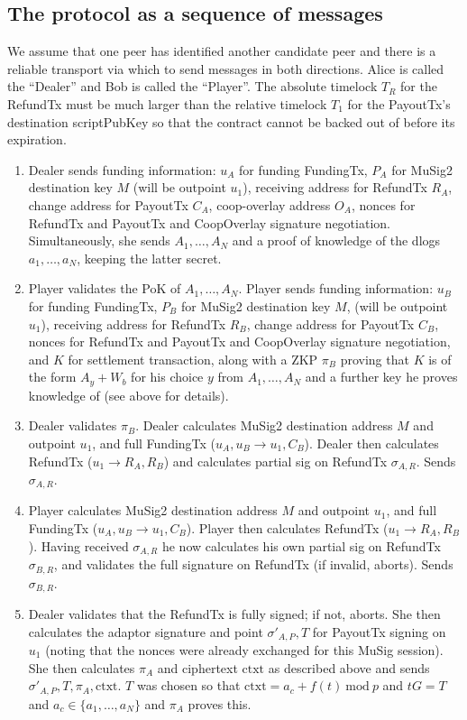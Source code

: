 \documentclass[11pt]{article}
\begin{document}
\subsection{The protocol as a sequence of messages}

We assume that one peer has identified another candidate peer and there is a reliable transport via which to send messages in both directions. Alice is called the ``Dealer'' and Bob is called the ``Player''. The absolute timelock $T_R$ for the RefundTx must be much larger than the relative timelock $T_1$ for the PayoutTx's destination scriptPubKey so that the contract cannot be backed out of before its expiration.

\begin{enumerate}
\item Dealer sends funding information: $u_A$ for funding FundingTx, $P_A$ for MuSig2 destination key $M$ (will be outpoint $u_1$), receiving address for RefundTx $R_A$, change address for PayoutTx $C_A$, coop-overlay address $O_A$, nonces for RefundTx and PayoutTx and CoopOverlay signature negotiation. Simultaneously, she sends $A_1,\dots,A_N$ and a proof of knowledge of the dlogs $a_1,\dots,a_N$, keeping the latter secret.
\item Player validates the PoK of $A_1,\dots,A_N$. Player sends funding information: $u_B$ for funding FundingTx, $P_B$ for MuSig2 destination key $M$, (will be outpoint $u_1$), receiving address for RefundTx $R_B$, change address for PayoutTx $C_B$, nonces for RefundTx and PayoutTx and CoopOverlay signature negotiation, and $K$ for settlement transaction, along with a ZKP $\pi_B$ proving that $K$ is of the form $A_y + W_b$ for his choice $y$ from $A_1,\dots,A_N$ and a further key he proves knowledge of (see above for details).
\item Dealer validates $\pi_B$. Dealer calculates MuSig2 destination address $M$ and outpoint $u_1$, and full FundingTx ($u_A, u_B \rightarrow u_1, C_B$). Dealer then calculates RefundTx ($u_1 \rightarrow R_A, R_B$) and calculates partial sig on RefundTx $\sigma_{A,R}$. Sends $\sigma_{A,R}$.
\item Player calculates MuSig2 destination address $M$ and outpoint $u_1$, and full FundingTx ($u_A, u_B \rightarrow u_1, C_B$). Player then calculates RefundTx ($u_1 \rightarrow R_A, R_B$). Having received $\sigma_{A,R}$ he now calculates his own partial sig on RefundTx $\sigma_{B,R}$, and validates the full signature on RefundTx (if invalid, aborts). Sends $\sigma_{B,R}$.
\item Dealer validates that the RefundTx is fully signed; if not, aborts. She then calculates the adaptor signature and point $\sigma'_{A, P}, T$ for PayoutTx signing on $u_1$ (noting that the nonces were already exchanged for this MuSig session).   She then calculates $\pi_A$ and ciphertext $\textrm{ctxt}$ as described above and sends $\sigma'_{A, P}, T, \pi_A, \textrm{ctxt}$. $T$ was chosen so that $\textrm{ctxt} = a_c + f(t)\ \textrm{mod}\ p$ and $tG = T$ and $a_c \in \{a_1,\dots,a_N\}$ and $\pi_A$ proves this.

\end{enumerate}
\end{document}
